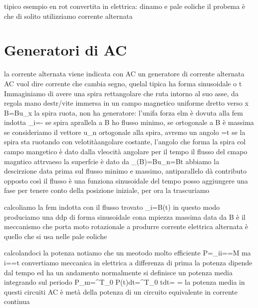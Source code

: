 {{\begin{examplewt}
tipico esempio en rot convertita in elettrica: dinamo e pale eoliche
il probema è che di solito utilizziamo corrente alternata



\end{examplewt}


\section{Generatori di AC}
la corrente alternata viene indicata con AC
un generatore di corrente alternata
AC vuol dire corrente che cambia segno, quelal tipica ha forma sinusoidale \sin o \cos \omega t
Immaginiamo di avere una spira rettangolare che ruta intorno al suo asse, \omega da regola mano destr/vite
immersa in un campo magnetico uniforme dretto verso x \vba B=B\vbh u_x
la spira ruota, non ha generatore: l'unifa forza elm è dovuta alla fem indotta
_i=-
se spira aprallela a B ho flusso minimo, se ortogonale a B è massima
se consideriamo il vettore \vbh u_n ortogonale alla spira, avremo un angolo \phi=\omega t
se la spira sta ruotando con velotitàangolare costante, l'angolo che forma la spira col campo mangetico è dato dalla vleocità angolare per il tempo
il flusso del cmapo magntico attrvaeso la superfcie è dato da
\Phi_\Sigma(\vba B)=B\vdot\vbh u_n\Sigma=\Sigma B\cos\omega t
abbiamo la descirzione data prima  sul flusso minimo e massimo, antiparallelo dà contributo opposto
così il flusso è una funziona sinusoidale del tempo
posso aggiungere una fase per tenere conto della posizione iniziale, per ora la trascuriamo 

calcoliamo la fem indotta con il flusso trovato
_i=\Sigma B\omega\sin(\omega t)
in questo modo produciamo una ddp di forma sinusoidale cona mpiezza massima data da \Sigma B\omega
è il meccanismo che porta moto rotazionale a produrre corrente elettrica alternata
è quello che si usa nelle pale eoliche

calcolandoci la potenza notiamo che  un meotodo molto efficiente
P=_ii==M\omega
ma i==\sin\omega t
convertiamo meccanica in elettrica
a differenza di prima la potenza dipende dal tempo ed ha un andamento
normalmente si definisce un potenza media integrando sul periodo
P_m=\int^T_0 P(t)dt=\int^T_0 \sin[2]\omega tdt=
=
la potenza media in questi circuiti AC è metà della potenza di un circuito equivalente in corrente continua

}}
